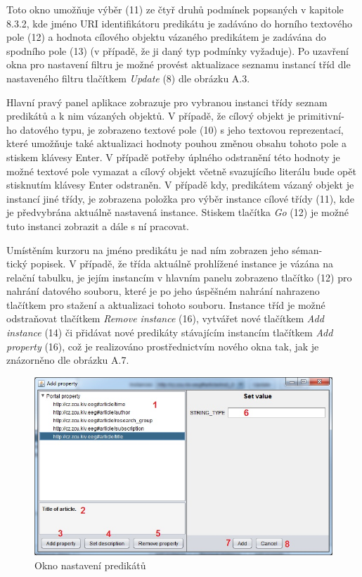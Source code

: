 \documentclass{projekt}
\begin{document}
\thispagestyle{plain}

Toto okno umožňuje výběr (11) ze čtyř druhů podmínek popsaných v kapitole 8.3.2, kde jméno URI identifikátoru predikátu je zadáváno do horního textového pole (12) a hodnota cílového objektu vázaného predikátem je zadávána do spodního pole (13) (v případě, že ji daný typ podmínky vyžaduje).
Po uzavření okna pro nastavení filtru je možné provést aktualizace seznamu instancí tříd dle nastaveného filtru tlačítkem {\it Update} (8) dle obrázku A.3.

Hlavní pravý panel aplikace zobrazuje pro vybranou instanci třídy seznam predikátů a k nim vázaných objektů. V případě, že cílový objekt je primitivní-\\ho datového typu, je zobrazeno textové pole (10) s jeho textovou reprezentací, které umožňuje také aktualizaci hodnoty pouhou změnou obsahu tohoto pole a stiskem klávesy Enter. V případě potřeby úplného odstranění této hodnoty je možné textové pole vymazat a cílový objekt včetně svazujícího literálu bude opět stisknutím klávesy Enter odstraněn. V případě kdy, predikátem vázaný objekt je instancí jiné třídy, je zobrazena položka pro výběr instance cílové třídy (11), kde je předvybrána aktuálně nastavená instance. Stiskem tlačítka {\it Go} (12) je možné tuto instanci zobrazit a dále s ní pracovat.


Umístěním kurzoru na jméno predikátu je nad ním zobrazen jeho séman-\\tický popisek. V případě, že třída aktuálně prohlížené instance je vázána na relační tabulku, je jejím instancím v hlavním panelu zobrazeno tlačítko (12) pro nahrání datového souboru, které je po jeho úspěšném nahrání nahrazeno tlačítkem pro stažení a aktualizaci tohoto souboru. Instance tříd je možné odstraňovat tlačítkem {\it Remove instance} (16), vytvářet nové tlačítkem {\it Add instance} (14) či přidávat nové predikáty stávajícím instancím tlačítkem {\it Add property} (16), což je realizováno prostřednictvím nového okna tak, jak je znázorněno dle obrázku A.7.

\begin{figure}[htb!]
\begin{center}
\includegraphics[scale=0.72]{manualTestProperty.jpg}
\caption{Okno nastavení predikátů}
\end{center}
\end{figure}
\end{document}

